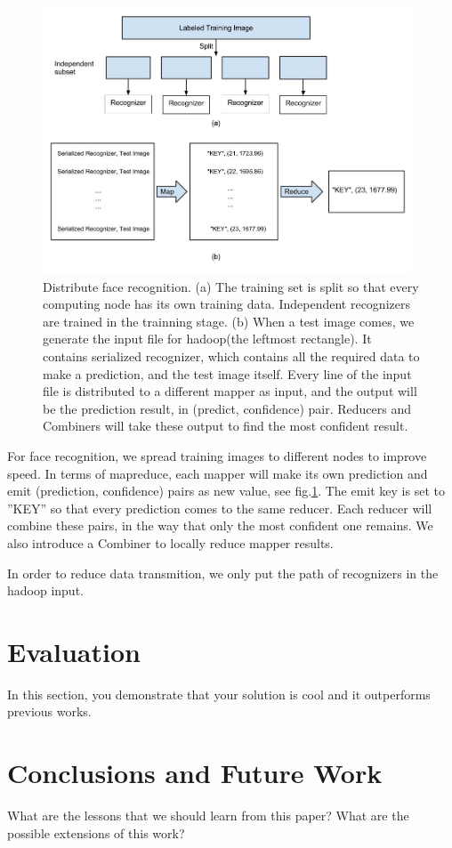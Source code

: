 \documentclass[11pt, draftclsnofoot, onecolumn]{IEEEtran}
\begin{document}
\begin{figure}
\centering
\includegraphics[height=300]{recog_overview}
\caption{Distribute face recognition. (a) The training set is split so that every computing node has its own training data. Independent recognizers are trained in the trainning stage. (b) When a test image comes, we generate the input file for hadoop(the leftmost rectangle). It contains serialized recognizer, which contains all the required data to make a prediction, and the test image itself. Every line of the input file is distributed to a different mapper as input, and the output will be the prediction result, in (predict, confidence) pair. Reducers and Combiners will take these output to find the most confident result.}
\label{fig:recog_overview}
\end{figure}

For face recognition, we spread training images to different nodes to improve speed. In terms of mapreduce, each mapper will make its own prediction and emit (prediction, confidence) pairs as new value, see fig.\ref{fig:recog_overview}. The emit key is set to ''KEY'' so that every prediction comes to the same reducer. Each reducer will combine these pairs, in the way that only the most confident one remains. We also introduce a Combiner to locally reduce mapper results. 

In order to reduce data transmition, we only put the path of recognizers in the hadoop input. 

\section{Evaluation} \label{sec:evaluation}

In this section, you demonstrate that your solution is cool 
and it outperforms previous works. 

\section{Conclusions and Future Work} \label{sec:conclusion}

What are the lessons that we should learn from this paper? 
What are the possible extensions of this work?


   
\end{document}
